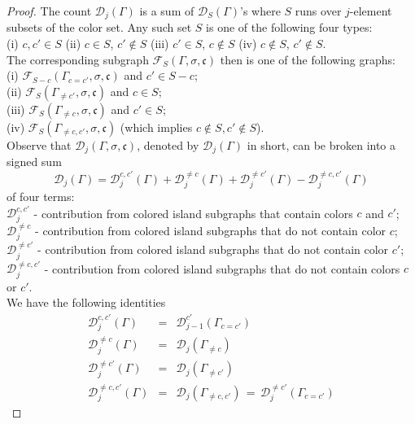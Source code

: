 \documentclass[10pt, reqno]{amsart}
\newcommand{\bgd}{\begin{displaymath}}
\newcommand{\edd}{\end{displaymath}}
\newcommand{\hf}{\hspace*{0.5cm}}
\theoremstyle{plain}
\theoremstyle{remark}
\theoremstyle{definition}
\numberwithin{equation}{section}
\begin{document}
\begin{proof}
The count $\mathscr{D}_j(\Gamma)$ is a sum of $\mathscr{D}_S(\Gamma)$'s where $S$ runs over $j$-element subsets of the color set. Any such set $S$ is one of the following four types: \\
\hf (i) $c,c'\in S$ (ii) $c\in S$, $c'\not\in S$ (iii) $c'\in S$, $c\not\in S$ (iv) $c\not\in S$, $c'\not\in S$. \\
The corresponding subgraph $\mathscr{F}_S(\Gamma,\sigma,\mathfrak{c})$ then is one of the following graphs:\\
\hf (i) $\mathscr{F}_{S-c}(\Gamma_{c=c'},\sigma,\mathfrak{c})$ and $c'\in S-c$; \\
\hf (ii) $\mathscr{F}_S(\Gamma_{\neq c'},\sigma,\mathfrak{c})$ and $c\in S$; \\
\hf (iii) $\mathscr{F}_S(\Gamma_{\neq c},\sigma,\mathfrak{c})$ and $c'\in S$; \\
\hf (iv) $\mathscr{F}_S(\Gamma_{\neq c,c'},\sigma,\mathfrak{c})$ (which implies $c\not\in S, c'\not\in S$). \\
Observe that $\mathscr{D}_j(\Gamma,\sigma,\mathfrak{c})$, denoted by $\mathscr{D}_j(\Gamma)$ in short, can be broken into a signed sum 
\bgd
\mathscr{D}_j(\Gamma)=\mathscr{D}_j^{c,c'}(\Gamma)+\mathscr{D}_j^{\neq c}(\Gamma)+\mathscr{D}_j^{\neq c'}(\Gamma)-\mathscr{D}_j^{\neq c,c'}(\Gamma)
\edd
of four terms:\\
\hf $\mathscr{D}_j^{c,c'}$ - contribution from colored island subgraphs that contain colors $c$ and $c'$;\\
\hf $\mathscr{D}_j^{\neq c}$ - contribution from colored island subgraphs that do not contain color $c$;\\
\hf $\mathscr{D}_j^{\neq c'}$ - contribution from colored island subgraphs that do not contain color $c'$;\\
\hf $\mathscr{D}_j^{\neq c,c'}$ - contribution from colored island subgraphs that do not contain colors $c$ or $c'$.\\
We have the following identities
\begin{eqnarray*}
\mathscr{D}_j^{c,c'}(\Gamma) & = & \mathscr{D}_{j-1}^{c'}(\Gamma_{c=c'})\\
\mathscr{D}_j^{\neq c}(\Gamma) & = & \mathscr{D}_{j}(\Gamma_{\neq c})\\
\mathscr{D}_j^{\neq c'}(\Gamma) & = & \mathscr{D}_{j}(\Gamma_{\neq c'})\\
\mathscr{D}_j^{\neq c,c'}(\Gamma) & = & \mathscr{D}_j(\Gamma_{\neq c,c'})\, =\, \mathscr{D}_{j}^{\neq c'}(\Gamma_{c=c'})

\end{eqnarray*}
\end{proof}
\end{document}
